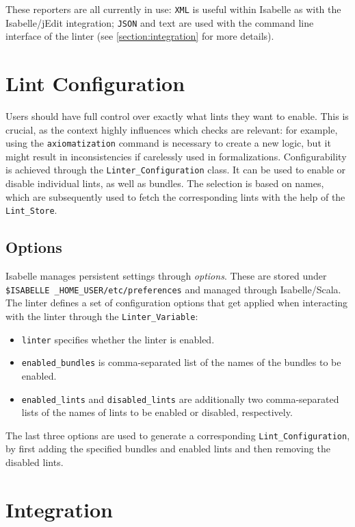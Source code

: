 These reporters are all currently in use: \texttt{XML} is useful
within Isabelle as with the Isabelle/jEdit integration;
\texttt{JSON} and text are used with the command line interface of the
linter (see \autoref{section:integration} for more details).

\section{Lint Configuration}\label{section:configuration}
Users should have full control over exactly what lints they want to 
enable. This is crucial, as the context highly influences which checks
are relevant: for example, using the \texttt{axiomatization} command
is necessary to create a new logic, but it might result in 
inconsistencies if carelessly used in formalizations. Configurability
is achieved through
the \texttt{Linter\_Configuration} class. It can be used to enable or
disable individual lints, as well as bundles. The selection
is based on names, which are subsequently used to fetch the corresponding 
lints with the help of the \texttt{Lint\_Store}.
\subsection{Options}\label{subsection:options}
Isabelle manages persistent settings through \textit{options}. These
are stored under \texttt{\$ISABELLE\allowbreak 
\_HOME\_USER/etc/preferences} and managed through Isabelle/Scala. The
linter defines a set of configuration options that get applied when
interacting with the linter through the \texttt{Linter\_Variable}:
\begin{itemize}
    \item \texttt{linter} specifies whether the linter is enabled.
    \item \texttt{enabled\_bundles} is comma-separated list of the names
    of the bundles to be enabled.
    \item \texttt{enabled\_lints} and \texttt{disabled\_lints} are
    additionally two comma-separated lists of the names of lints to be
    enabled or disabled, respectively.
\end{itemize}
The last three options are used to generate a corresponding
\texttt{Lint\_Configuration}, by first adding the specified bundles
and enabled lints and then removing the disabled lints.

\section{Integration}\label{section:integration}
